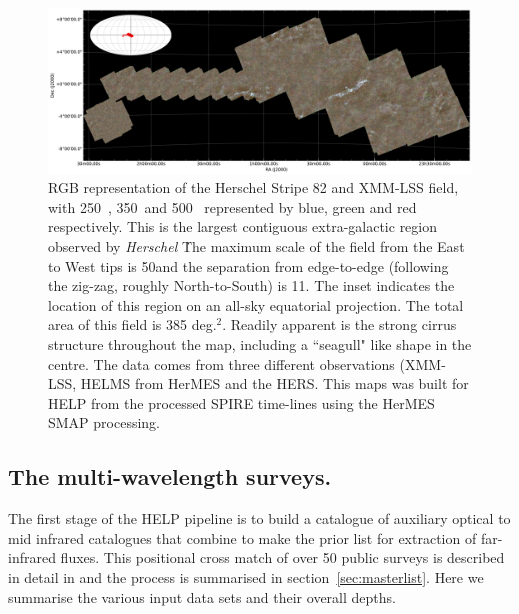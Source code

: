 \documentclass[usenatbib]{mnras}
\newcommand{\Herschel}{\textit{Herschel} }
\newcommand{\um}{\micron\  }
\begin{document}
\begin{figure}
  \centering \includegraphics[width=16cm, angle=0]{figs/helms_hers_xmm-lss-rgb-sm.pdf}

  \caption[Three-colour image of Herschel Strip 82 region]{RGB representation of
    the Herschel Stripe 82 and XMM-LSS field, with 250\um, 350\um and 500\um
    represented by blue, green and red respectively. This is the largest
    contiguous extra-galactic region observed by \Herschel\.  The maximum scale
    of the field from the East to West tips is  50\degr and the separation from
    edge-to-edge (following the zig-zag, roughly North-to-South) is 11\degr. The
    inset indicates the location of this region on an all-sky equatorial
    projection. The total area of  this field is 385 deg.$^2$. Readily apparent
    is the strong cirrus structure throughout the map, including a ``seagull"
    like shape in the centre.  The data comes from three different observations
    (XMM-LSS, HELMS from HerMES \citealt{Oliver:2012} and the HERS. This maps
    was built for HELP from the processed SPIRE time-lines using the HerMES SMAP
    processing.}\label{fig:hs82}
\end{figure}

\subsection[The multi-wavelength surveys.\\ 
{\color{red} This refers to the summary in optical NIR in Raph's paper but lists also the other surveys (i.e. at UV, X-ray, mid-IR, FIR, sub-mm and Radio) and whether or not they are included in DR1.  It might be sensible to merge this with the previous section}]{The multi-wavelength surveys.}\label{sec:surveys}

The first stage of the HELP pipeline is to build a catalogue of auxiliary optical to mid infrared catalogues that combine to make the prior list for extraction of far-infrared fluxes. This positional cross match of over 50 public surveys is described in detail in \citep{Shirley:2019} and the process is summarised in section~\ref{sec:masterlist}. Here we summarise the various input data sets and their overall depths.
\end{document}
